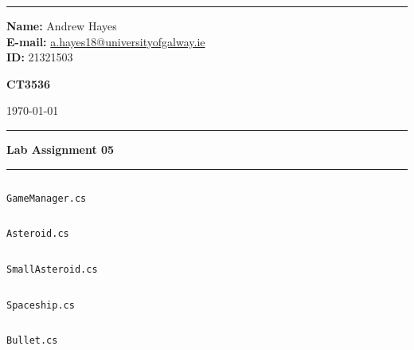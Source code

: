 \documentclass[a4paper, 11pt]{article}
\newenvironment{code}{\captionsetup{type=listing, skip=0pt}}{}
\begin{document}
\hrule \medskip
\begin{minipage}{0.295\textwidth} 
    \raggedright
    \footnotesize 
    \textbf{Name:} Andrew Hayes \\
    \textbf{E-mail:} \href{mailto://a.hayes18@universityofgalway.ie}{a.hayes18@universityofgalway.ie}  \hfill\\   
    \textbf{ID:} 21321503 \hfill
\end{minipage}
\begin{minipage}{0.4\textwidth} 
    \centering 
    \vspace{0.4em}
    \Large 
    \textbf{CT3536} \\ 
\end{minipage}
\begin{minipage}{0.295\textwidth} 
    \raggedleft
    \today
\end{minipage}
\medskip\hrule 
\begin{center}
    \normalsize
    \textbf{Lab Assignment 05}
\end{center}
\hrule

\begin{code}
    \inputminted[texcl, mathescape, breaklines, frame=single, linenos]{csharp}{../code/GameManager.cs}
\caption{\texttt{GameManager.cs}}
\end{code}

\begin{code}
\inputminted[texcl, mathescape, breaklines, frame=single, linenos]{csharp}{../code/Asteroid.cs}
\caption{\texttt{Asteroid.cs}}
\end{code}

\begin{code}
\inputminted[texcl, mathescape, breaklines, frame=single, linenos]{csharp}{../code/SmallAsteroid.cs}
\caption{\texttt{SmallAsteroid.cs}}
\end{code}

\begin{code}
\inputminted[texcl, mathescape, breaklines, frame=single, linenos]{csharp}{../code/Spaceship.cs}
\caption{\texttt{Spaceship.cs}}
\end{code}

\begin{code}
\inputminted[texcl, mathescape, breaklines, frame=single, linenos]{csharp}{../code/Bullet.cs}
\caption{\texttt{Bullet.cs}}
\end{code}
\end{document}
